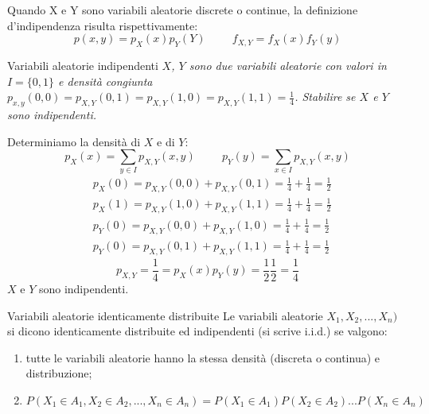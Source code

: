 Quando X e Y sono variabili aleatorie discrete o continue, la definizione d’indipendenza risulta rispettivamente:
\begin{equation*}
    p(x,y)=p_X(x)p_Y(Y)\hspace{1cm}f_{X,Y}=f_X(x)f_Y(y)
\end{equation*}

\begin{Example}{Variabili aleatorie indipendenti}{}
    \textit{$X$, $Y$ sono due variabili aleatorie con valori in $I=\{0,1\}$ e densità congiunta $p_{x,y}(0,0)=p_{X,Y}(0,1)=p_{X,Y}(1,0)=p_{X,Y}(1,1)=\frac{1}{4}$. Stabilire se $X$ e $Y$ sono indipendenti.}

    Determiniamo la densità di $X$ e di $Y$:
    \begin{equation*}
        p_X(x)=\sum_{y\in I}p_{X,Y}(x,y)\hspace{1cm}p_Y(y)=\sum_{x\in I}p_{X,Y}(x,y)
    \end{equation*}
    \begin{align*}
        &p_X(0)=p_{X,Y}(0,0)+p_{X,Y}(0,1)=\frac{1}{4}+\frac{1}{4}=\frac{1}{2}\\
        &p_X(1)=p_{X,Y}(1,0)+p_{X,Y}(1,1)=\frac{1}{4}+\frac{1}{4}=\frac{1}{2}\\
        &p_Y(0)=p_{X,Y}(0,0)+p_{X,Y}(1,0)=\frac{1}{4}+\frac{1}{4}=\frac{1}{2}\\
        &p_Y(0)=p_{X,Y}(0,1)+p_{X,Y}(1,1)=\frac{1}{4}+\frac{1}{4}=\frac{1}{2}
    \end{align*}
    \begin{equation*}
        p_{X,Y}=\frac{1}{4}=p_X(x)p_Y(y)=\frac{1}{2}\frac{1}{2}=\frac{1}{4}
    \end{equation*}
    $X$ e $Y$ sono indipendenti.
\end{Example}

\begin{Definition}{Variabili aleatorie identicamente distribuite}{}
    Le variabili aleatorie $X_1, X_2, ...,X_n)$ si dicono identicamente distribuite ed indipendenti (si scrive i.i.d.) se valgono:
    \begin{enumerate}
        \item tutte le variabili aleatorie hanno la stessa densità (discreta o continua) e distribuzione;
        \item
        \begin{equation*}
            P(X_1\in A_1, X_2\in A_2, ...,X_n\in A_n)=P(X_1\in A_1)P(X_2\in A_2)...P(X_n\in A_n)
        \end{equation*}
    \end{enumerate}
\end{Definition}

